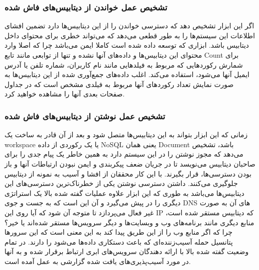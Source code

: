 \documentclass[10pt, a4paper]{article}
\begin{document}

\subsubsection{تشخیص عمل خواندن از دیتابیس‌های فاش شده}

اگر این ابزار تشخیص دهد که دسترسی خواندن را از این دیتابیس‌ها دارد تضمین افشای
اطلاعات این سیستم‌ها را به طور قطعی می‌دهد که می‌تواند خطری برای محتوای داخل
دیتابیس باشد. ابزاری که توسعه داده شده است کاملا ایمن می‌باشد چرا که اصلا وارد
محتوای این دیتابیس‌ها و داده‌های آنها نشده و تنها از توابعی مانند تابع Count
برای شمارش رکورد‌هایی که مربوط به فیلد‌هایی مانند نام کاربران، شماره تلفن یا
آدرس ایمیل آنها می‌شود، استفاده می‌کند. اغلب داده‌های جمع‌آوری شده از این
دیتابیس‌ها به صورت نمایش تعداد رکورد‌های آنها مربوط به فیلدی مشخص است که در
جداول صفحات بعدی آنها را مشاهده خواهید کرد.

\subsubsection{تشخیص عمل نوشتن از دیتابیس‌های فاش شده}

زمانی که این ابزار بتواند به این دیتابیس‌ها متصل شود و بعد از آن قادر به ساخت یک
workspace یا یک رکوردی از داده‌ NoSQL یعنی همان Document باشد، تشخیص می‌دهد که
مجوز نوشتن را در این سیستم دارد به همین خاطر یک پیام جدی را برای صاحبان دیتابیس
می‌نویسد تا در جریان ضعف پیکربندی و ایمن نبودن ارتباطات آنها و باز بودن
دسترسی‌ها، قرار بگیرند. با این کار محققان از افشا و آسیب به نمونه از دیتابیس
جلوگیری می‌کنند. داشتن دسترسی نوشتن یکی از خطرناک‌ترین دسترسی‌های این دیتابیس‌ها
می‌باشد به طوری که این ابزار علاوه عملیات گفته شده بالا یک استراتژی دیگری را در
پیش می‌گیرد و آن این است که به جست و جوی DNS های آن به صورت غیر فعال می‌پردازد
تا متوجه آن شود که آیا روی این IP که دیتابیس مستقر شده است، منابع دیگری مانند
برنامه‌های وب و وبسایت‌ها و دیگر سرویس‌ها مستقر شده‌اند یا خیر؟ چرا که اگر منابع
وب را از این طریق پیدا کند به این معنی است که این سرور‌ها پتانسیل حمله
آسیب‌زننده‌ای که باعث دستکاری داده‌ها می‌شود را دارند. در تمام وضعیت گفته شده
بالا با ارائه دهندگان سرویس‌های ابری ارتباط برقرار شده و به آنها در مورد
آسیب‌پذیری‌های یافت شده گزارشی به عمل آمده است.
\end{document}
